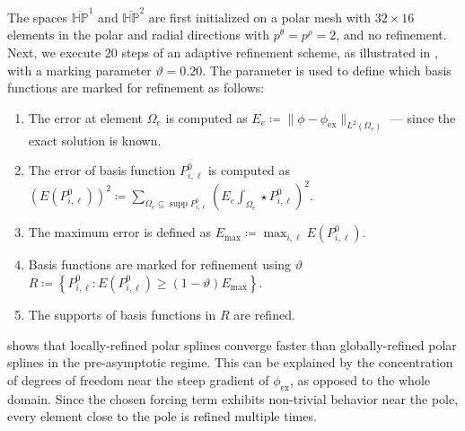 \documentclass[10pt]{article}
\DeclareMathOperator{\supp}{supp}
\newcommand{\vSpace}[1]{\mathbb{#1}}
\newcommand{\polar}{P}
\newcommand{\hSpace}[1]{\mathit{\vSpace{H}\vSpace{#1}}}
\theoremstyle{plain}
\theoremstyle{definition}
\theoremstyle{remark}
\begin{document}
The spaces \(\overline{\hSpace{\polar}}^1\) and \(\overline{\hSpace{\polar}}^2\) are first
initialized on a polar mesh with \(32 \times 16\) elements in the polar and radial
directions with \(p^\theta = p^\rho = 2\), and no refinement. Next, we execute 20 steps of
an adaptive refinement scheme, as illustrated in , with a marking
parameter \(\vartheta=0.20\). The parameter is used to define which basis functions are
marked for refinement as follows:
\begin{enumerate}
    \item The error at element \(\Omega_e\) is computed as \(E_e \coloneqq \|\phi -
        \phi_{\text{ex}}\|_{L^2(\Omega_e)}\) --- since the exact solution is known.
    \item The error of basis function \(P^0_{i, \ell}\) is computed as 
        \(
            (E(P^0_{i, \ell}))^2 \coloneqq 
            \sum\limits_{\Omega_e \subseteq \supp P^0_{i,
            \ell}}\left(E_e\int_{\Omega_e}
            \star P^0_{i, \ell}\right)^2.
        \)
    \item The maximum error is defined as 
        \(
            E_{\text{max}} \coloneqq \max_{i, \ell} E(P^0_{i, \ell}).
        \)
    \item Basis functions are marked for refinement using \(\vartheta\)
        \(
            R \coloneqq\left\{P^0_{i, \ell}: E(P^0_{i, \ell}) \geq
            (1-\vartheta)E_{\text{max}}\right\}.
        \)
    \item The supports of basis functions in \(R\) are refined.
\end{enumerate}

 shows that locally-refined polar splines converge faster than
globally-refined polar splines in the pre-asymptotic regime.
This can be explained by the concentration of degrees of freedom near the steep gradient of
\(\phi_{\text{ex}}\), as opposed to the whole domain.
Since the chosen forcing term exhibits non-trivial behavior near the pole, every element
close to the pole is refined multiple times.
\end{document}
